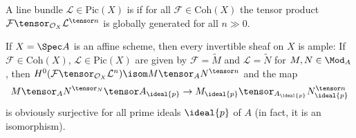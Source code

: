 \documentclass[wip, algebra]{bsteffan-lecturenotes}
\newcommand{\cO}{\mathcal{O}}
\newcommand{\cF}{\mathcal{F}}
\newcommand{\cL}{\mathcal{L}}
\newcommand{\Pic}{\mathrm{Pic}}
\newcommand{\Coh}{\mathrm{Coh}}
\begin{document}
\begin{definition}
	A line bundle $\cL \in \Pic(X)$ is  if for all $\cF \in \Coh(X)$ the tensor product $\cF \tensor_{\cO_X} \cL^{\tensor n}$ is globally generated for all $n \gg 0$.
\end{definition}
\begin{example}
	If $X = \Spec A$ is an affine scheme, then every invertible sheaf on $X$ is ample:
	If $\cF \in \Coh(X)$, $\cL \in \Pic(X)$ are given by $\cF = \widetilde{M}$ and $\cL = \widetilde{N}$ for $M, N \in \Mod_A$, then $H^0(\cF \tensor_{\cO_X} \cL^n) \isom M \tensor_A N^{\tensor n}$ and the map 
	\begin{equation*}
		M \tensor_A N^{\tensor_N} \tensor A_{\ideal{p}} \to M_{\ideal{p}} \tensor_{A_{\ideal{p}}} N_{\ideal{p}}^{\tensor n}
	\end{equation*}
	is obviously surjective for all prime ideals $\ideal{p}$ of $A$ (in fact, it is an isomorphism).
\end{example}
\end{document}
